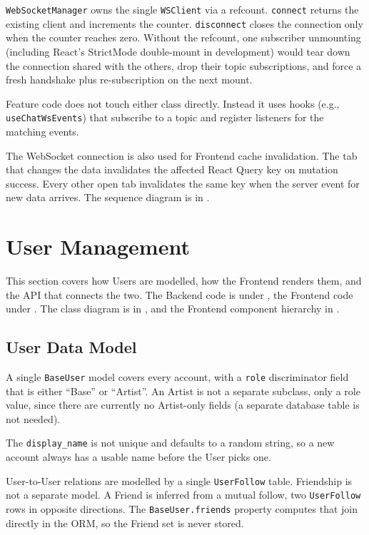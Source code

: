 \texttt{WebSocketManager} owns the single \texttt{WSClient} via a
refcount. \texttt{connect} returns the existing client and increments
the counter. \texttt{disconnect} closes the connection only when the
counter reaches zero. Without the refcount, one subscriber unmounting
(including React's StrictMode double-mount in development)
would tear down the connection shared with the others, drop their
topic subscriptions, and force a fresh handshake plus re-subscription
on the next mount.

Feature code does not touch either class directly. Instead it uses
hooks (e.g., \texttt{useChatWsEvents}) that subscribe to a topic and
register listeners for the matching events.

The WebSocket connection is also used for Frontend cache invalidation.
The tab that changes the data invalidates the affected React Query
key on mutation success. Every other open tab invalidates the same key
when the server event for new data arrives. The sequence diagram is in
.


\section{User Management}
This section covers how Users are modelled, how the Frontend renders
them, and the API that connects the two. The Backend code is under
, the Frontend code under
. The class diagram is
in , and the Frontend
component hierarchy in .

\subsection{User Data Model}
A single \texttt{BaseUser} model covers every account, with a
\texttt{role} discriminator field that is either ``Base'' or ``Artist''.
An Artist is not a separate subclass, only a role value, since there are currently
no Artist-only fields (a separate database table is not needed).

The \texttt{display\_name} is not unique and defaults to a random
string, so a new account always has a usable name before the User
picks one.

User-to-User relations are modelled by a single \texttt{UserFollow}
table. Friendship is not a separate model. A Friend is inferred from a
mutual follow, two \texttt{UserFollow} rows in opposite directions.
The \texttt{BaseUser.friends} property computes that join directly in
the ORM, so the Friend set is never stored.

